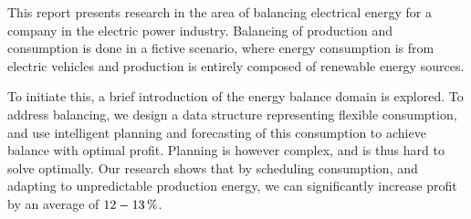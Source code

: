 This report presents research in the area of balancing electrical energy for a company in the electric power industry. Balancing of production and consumption is done in a fictive scenario, where energy consumption is from electric vehicles and production is entirely composed of renewable energy sources.

To initiate this, a brief introduction of the energy balance domain is explored. To address balancing, we design a data structure representing flexible consumption, and use intelligent planning and forecasting of this consumption to achieve balance with optimal profit. Planning is however complex, and is thus hard to solve optimally. Our research shows that by scheduling consumption, and adapting to unpredictable production energy, we can significantly increase profit by an average of $12-\SI{13}{\percent}$.
